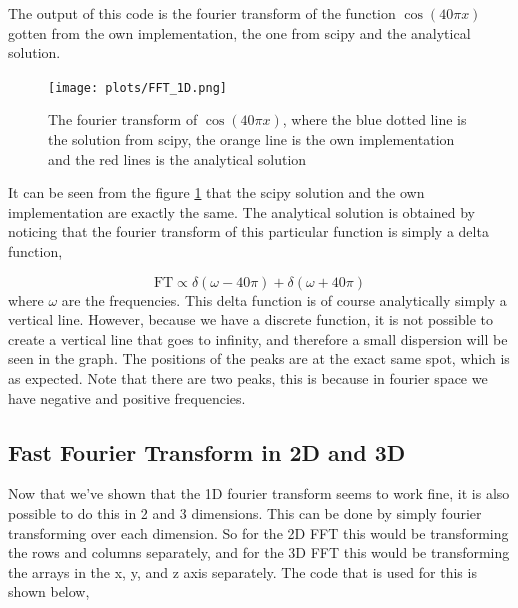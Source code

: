 
The output of this code is the fourier transform of the function $\cos(40\pi x)$ gotten from the own implementation, the one from scipy and the analytical solution.

\begin{figure}[h]
\centering
\texttt{[image: plots/FFT\_1D.png]}
\caption{The fourier transform of $\cos(40\pi x)$, where the blue dotted line is the solution from scipy, the orange line is the own implementation and the red lines is the analytical solution}
\label{FFT_1D}
\end{figure}

It can be seen from the figure \ref{FFT_1D} that the scipy solution and the own implementation are exactly the same. The analytical solution is obtained by noticing that the fourier transform of this particular function is simply a delta function,

\begin{equation*}
\mathrm{FT} \propto \delta\left(\omega - 40\pi\right) + \delta\left(\omega + 40\pi\right) 
\end{equation*}
where $\omega$ are the frequencies. This delta function is of course analytically simply a vertical line. However, because we have a discrete function, it is not possible to create a vertical line that goes to infinity, and therefore a small dispersion will be seen in the graph. The positions of the peaks are at the exact same spot, which is as expected. Note that there are two peaks, this is because in fourier space we have negative and positive frequencies.

\subsection{Fast Fourier Transform in 2D and 3D}

Now that we've shown that the 1D fourier transform seems to work fine, it is also possible to do this in 2 and 3 dimensions. This can be done by simply fourier transforming over each dimension. So for the 2D FFT this would be transforming the rows and columns separately, and for the 3D FFT this would be transforming the arrays in the x, y, and z axis separately. The code that is used for this is shown below,

